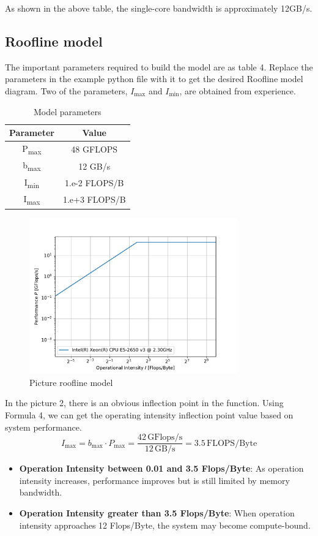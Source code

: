 \documentclass[unicode,11pt,a4paper,oneside,numbers=endperiod,openany]{scrartcl}
\begin{document}
As shown in the above table, the single-core bandwidth is approximately 12GB/s.


\subsection{Roofline model}
The important parameters required to build the model are as table 4. Replace the parameters in the example python file with it to get the desired Roofline model diagram. Two of the parameters, \( I_{\text{max}} \) and \( I_{\text{min}} \), are obtained from experience\cite{hager2010introduction}.

\begin{table}[h]
\centering
\begin{tabular}{|c|c|}
    \hline
    \textbf{Parameter} & \textbf{Value} \\
    \hline
    P\textsubscript{max} & 48 GFLOPS \\
    \hline
    b\textsubscript{max} & 12 GB/s \\
    \hline
    I\textsubscript{min} & 1.e-2 FLOPS/B \\
    \hline
    I\textsubscript{max} & 1.e+3 FLOPS/B \\
    \hline
\end{tabular}
\caption{Model parameters} 
\label{tab:memory_cache} 
\end{table}


\begin{figure}[h]
    \centering
    \includegraphics[width=0.8\textwidth]{pictures/roofline.pdf}
    \caption{Picture roofline model}
\end{figure}
In the picture 2, there is an obvious inflection point in the function. Using Formula 4, we can get the operating intensity inflection point value based on system performance.
\begin{equation}
    I_{\text{max}} = b_{\text{max}} \cdot P_{\text{max}} = \frac{42 \, \text{GFlops/s}}{12 \, \text{GB/s}} = 3.5 \, \text{FLOPS/Byte}
\end{equation}
\begin{itemize}
\item \textbf{Operation Intensity between 0.01 and 3.5 Flops/Byte}:
As operation intensity increases, performance improves but is still limited by memory bandwidth.
\item \textbf{Operation Intensity greater than 3.5 Flops/Byte}:
When operation intensity approaches 12 Flops/Byte, the system may become compute-bound.
\end{itemize}
\end{document}
